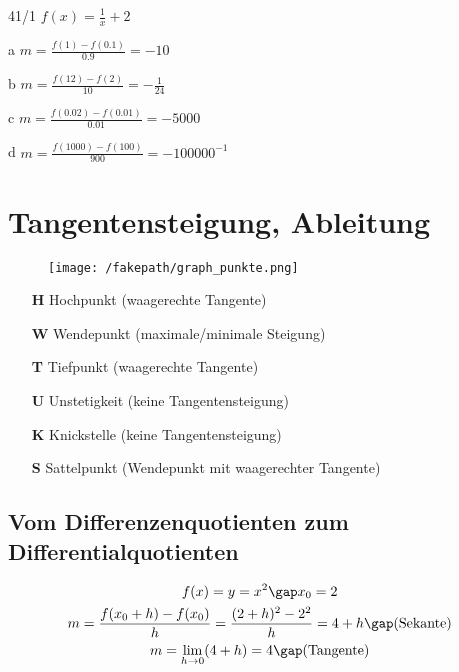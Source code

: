\begin{onepage}
  \begin{exercise}{41/1}
    $f(x) = \frac{1}{x} + 2$
    \item [a] $m = \frac{f(1) - f(0.1)}{0.9} = -10$
    \item [b] $m = \frac{f(12) - f(2)}{10} = -\frac{1}{24}$
    \item [c] $m = \frac{f(0.02) - f(0.01)}{0.01} = -5000$
    \item [d] $m = \frac{f(1000) - f(100)}{900} = -100000^{-1}$
  \end{exercise}
\end{onepage}

\section{Tangentensteigung, Ableitung}
\begin{figure}[H]
  \centering
  \texttt{[image: /fakepath/graph\_punkte.png]}
\end{figure}
\begin{enumerate}
  \item [\textbf{H}] Hochpunkt (waagerechte Tangente)
  \item [\textbf{W}] Wendepunkt (maximale/minimale Steigung)
  \item [\textbf{T}] Tiefpunkt (waagerechte Tangente)
  \item [\textbf{U}] Unstetigkeit (keine Tangentensteigung)
  \item [\textbf{K}] Knickstelle (keine Tangentensteigung)
  \item [\textbf{S}] Sattelpunkt (Wendepunkt mit waagerechter Tangente)
\end{enumerate}
\subsection{Vom Differenzenquotienten zum Differentialquotienten}
\begin{gather*}
  f(x) = y = x^2\gap x_0 = 2 \\
  m = \frac{f(x_0 + h) - f(x_0)}{h} = \frac{(2 + h)^2 - 2^2}{h} = 4 + h \gap\text{(Sekante)} \\
  m = \lim\limits_{h \to 0} (4 + h) = 4 \gap\text{(Tangente)}
\end{gather*}
